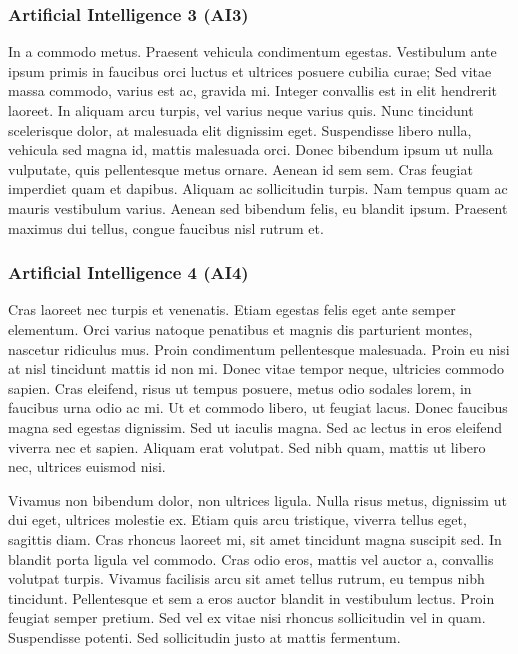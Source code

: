 \documentclass{article}
\begin{document}
\subsubsection{Artificial Intelligence 3 (AI3)}

In a commodo metus. Praesent vehicula condimentum egestas. Vestibulum ante ipsum primis in faucibus orci luctus et ultrices posuere cubilia curae; Sed vitae massa commodo, varius est ac, gravida mi. Integer convallis est in elit hendrerit laoreet. In aliquam arcu turpis, vel varius neque varius quis. Nunc tincidunt scelerisque dolor, at malesuada elit dignissim eget. Suspendisse libero nulla, vehicula sed magna id, mattis malesuada orci. Donec bibendum ipsum ut nulla vulputate, quis pellentesque metus ornare. Aenean id sem sem. Cras feugiat imperdiet quam et dapibus. Aliquam ac sollicitudin turpis. Nam tempus quam ac mauris vestibulum varius. Aenean sed bibendum felis, eu blandit ipsum. Praesent maximus dui tellus, congue faucibus nisl rutrum et. 

\subsubsection{Artificial Intelligence 4 (AI4)}

Cras laoreet nec turpis et venenatis. Etiam egestas felis eget ante semper elementum. Orci varius natoque penatibus et magnis dis parturient montes, nascetur ridiculus mus. Proin condimentum pellentesque malesuada. Proin eu nisi at nisl tincidunt mattis id non mi. Donec vitae tempor neque, ultricies commodo sapien. Cras eleifend, risus ut tempus posuere, metus odio sodales lorem, in faucibus urna odio ac mi. Ut et commodo libero, ut feugiat lacus. Donec faucibus magna sed egestas dignissim. Sed ut iaculis magna. Sed ac lectus in eros eleifend viverra nec et sapien. Aliquam erat volutpat. Sed nibh quam, mattis ut libero nec, ultrices euismod nisi.

Vivamus non bibendum dolor, non ultrices ligula. Nulla risus metus, dignissim ut dui eget, ultrices molestie ex. Etiam quis arcu tristique, viverra tellus eget, sagittis diam. Cras rhoncus laoreet mi, sit amet tincidunt magna suscipit sed. In blandit porta ligula vel commodo. Cras odio eros, mattis vel auctor a, convallis volutpat turpis. Vivamus facilisis arcu sit amet tellus rutrum, eu tempus nibh tincidunt. Pellentesque et sem a eros auctor blandit in vestibulum lectus. Proin feugiat semper pretium. Sed vel ex vitae nisi rhoncus sollicitudin vel in quam. Suspendisse potenti. Sed sollicitudin justo at mattis fermentum. 
\end{document}
